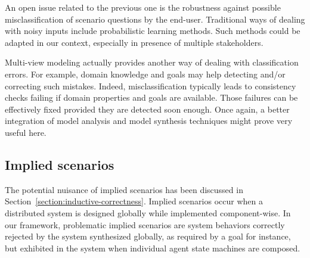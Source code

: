 An open issue related to the previous one is the robustness against possible misclassification of scenario questions by the end-user. Traditional ways of dealing with noisy inputs include probabilistic learning methods. Such methods could be adapted in our context, especially in presence of multiple stakeholders.

Multi-view modeling actually provides another way of dealing with classification errors. For example, domain knowledge and goals may help detecting and/or correcting such mistakes. Indeed, misclassification typically leads to consistency checks failing if domain properties and goals are available. Those failures can be effectively fixed provided they are detected soon enough. Once again, a better integration of model analysis and model synthesis techniques might prove very useful here.

\subsection*{Implied scenarios}

The potential nuisance of implied scenarios has been discussed in Section~\ref{section:inductive-correctness}. Implied scenarios occur when a distributed system is designed globally while implemented component-wise. In our framework, problematic implied scenarios are system behaviors correctly rejected by the system synthesized globally, as required by a goal for instance, but exhibited in the system when individual agent state machines are composed.

